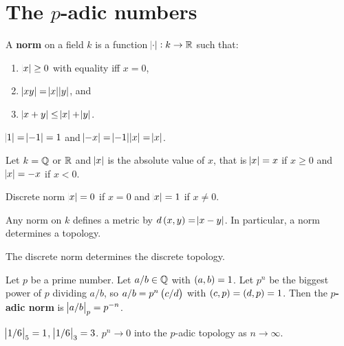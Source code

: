 \section{The $ p $-adic numbers}

\begin{definition}
A \textbf{norm} on a field $ k $ is a function $ \abs{\cdot} : k \to \mathbb{R} $ such that:
\begin{enumerate}
\item $ \abs{x} \ge 0 $ with equality iff $ x = 0 $,
\item $ \abs{xy} = \abs{x}\abs{y} $, and
\item $ \abs{x + y} \le \abs{x} + \abs{y} $.
\end{enumerate}
\end{definition}

\begin{note*}
$ \abs{1} = \abs{-1} = 1 $ and $ \abs{-x} = \abs{-1}\abs{x} = \abs{x} $.
\end{note*}

\begin{example*}
Let $ k = \mathbb{Q} $ or $ \mathbb{R} $ and $ \abs{x} $ is the absolute value of $ x $, that is $ \abs{x} = x $ if $ x \ge 0 $ and $ \abs{x} = -x $ if $ x < 0 $.
\end{example*}

\begin{example*}
Discrete norm $ \abs{x} = 0 $ if $ x = 0 $ and $ \abs{x} = 1 $ if $ x \ne 0 $.
\end{example*}

\begin{remark}
Any norm on $ k $ defines a metric by $ d\br{x, y} = \abs{x - y} $. In particular, a norm determines a topology.
\end{remark}

\begin{example*}
The discrete norm determines the discrete topology.
\end{example*}

\begin{definition}
Let $ p $ be a prime number. Let $ a / b \in \mathbb{Q} $ with $ \br{a, b} = 1 $. Let $ p^n $ be the biggest power of $ p $ dividing $ a / b $, so $ a / b = p^n \br{c / d} $ with $ \br{c, p} = \br{d, p} = 1 $. Then the \textbf{$ p $-adic norm} is $ \abs{a / b}_p = p^{-n} $.
\end{definition}

\begin{example*}
$ \abs{1 / 6}_5 = 1 $, $ \abs{1 / 6}_3 = 3 $. $ p^n \to 0 $ into the $ p $-adic topology as $ n \to \infty $.
\end{example*}

